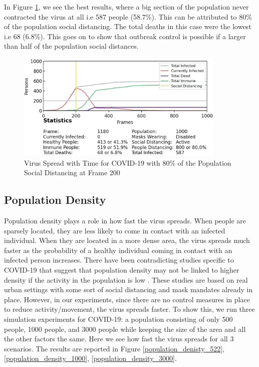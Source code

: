 \documentclass[11pt]{article}
\begin{document}
\begin{enumerate}
In Figure \ref{social_distancing_80percent}, we see the best results, where a big section of the population never contracted the virus at all i.e 587 people (58.7\%). This can be attributed to 80\% of the population social distancing. The total deaths in this case were the lowest i.e 68 (6.8\%). This goes on to show that outbreak control is possible if a larger than half of the population social distances.

\begin{figure}[H]
    \centering
    \includegraphics[width=10cm]{figures/social_distancing_80percent.png}
    \caption{Virus Spread with Time for COVID-19 with 80\% of the Population Social Distancing at Frame 200}
    \label{social_distancing_80percent}
\end{figure}


\end{enumerate}

\subsection{Population Density}
Population density plays a role in how fast the virus spreads. When people are sparsely located, they are less likely to come in contact with an infected individual\cite{density}. When they are located in a more dense area, the virus spreads much faster as the probability of a healthy individual coming in contact with an infected person increases. There have been contradicting studies specific to COVID-19 that suggest that population density may not be linked to higher density if the activity in the population is low \cite{covid_lowdeath}\cite{covid_urban}. These studies are based on real urban settings with some sort of social distancing and mask mandates already in place. However, in our experiments, since there are no control measures in place to reduce activity/movement, the virus spreads faster. To show this, we run three simulation experiments for COVID-19: a population consisting of only 500 people, 1000 people, and 3000 people while keeping the size of the area and all the other factors the same. Here we see how fast the virus spreads for all 3 scenarios. The results are reported in Figure \ref{population_denisty_522}, \ref{population_density_1000}, \ref{population_density_3000}. 
\end{document}
